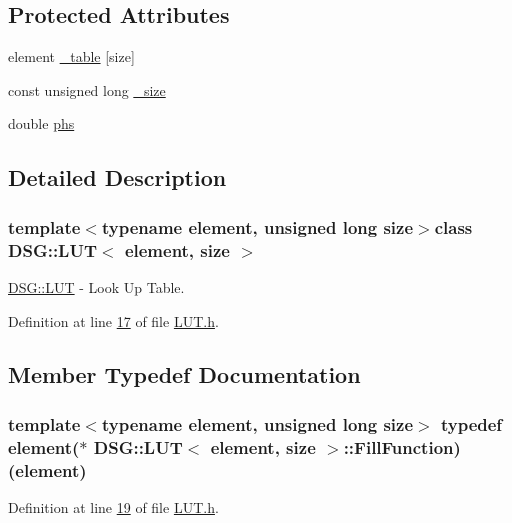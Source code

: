 \subsection*{Protected Attributes}
\begin{DoxyCompactItemize}
\item 
element \hyperlink{class_d_s_g_1_1_l_u_t_ac8b23bbb7ce259d4ceb1c6fa93a7f29f}{\+\_\+table} \mbox{[}size\mbox{]}
\item 
const unsigned long \hyperlink{class_d_s_g_1_1_l_u_t_a87c352b5eaea2188955213c0f4ae9799}{\+\_\+size}
\item 
double \hyperlink{class_d_s_g_1_1_l_u_t_a9ab8f8e89346c759e06f6d76c5b816cc}{phs}
\end{DoxyCompactItemize}


\subsection{Detailed Description}
\subsubsection*{template$<$typename element, unsigned long size$>$class D\+S\+G\+::\+L\+U\+T$<$ element, size $>$}

\hyperlink{class_d_s_g_1_1_l_u_t}{D\+S\+G\+::\+L\+U\+T} -\/ Look Up Table. 

Definition at line \hyperlink{_l_u_t_8h_source_l00017}{17} of file \hyperlink{_l_u_t_8h_source}{L\+U\+T.\+h}.



\subsection{Member Typedef Documentation}
\hypertarget{class_d_s_g_1_1_l_u_t_af2436acdd3f277cc4cac77c3c07cb4ca}{
\subsubsection[{Fill\+Function}]{\setlength{\rightskip}{0pt plus 5cm}template$<$typename element, unsigned long size$>$ typedef element($\ast$ {\bf D\+S\+G\+::\+L\+U\+T}$<$ element, size $>$\+::Fill\+Function)(element)}}\label{class_d_s_g_1_1_l_u_t_af2436acdd3f277cc4cac77c3c07cb4ca}


Definition at line \hyperlink{_l_u_t_8h_source_l00019}{19} of file \hyperlink{_l_u_t_8h_source}{L\+U\+T.\+h}.

